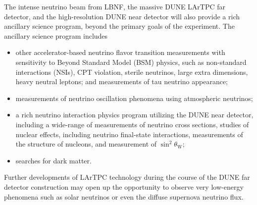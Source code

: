 The intense neutrino beam from LBNF, the massive DUNE LArTPC far detector, and the high-resolution
DUNE near detector will also provide a rich ancillary science program, beyond the primary goals of the experiment. The ancillary science program includes
\begin{itemize}
     \item other accelerator-based neutrino flavor transition measurements with sensitivity to Beyond Standard Model (BSM) physics, such as non-standard interactions (NSIs), CPT violation, sterile neutrinos, large extra dimensions, heavy neutral leptons;
 and measurements of tau neutrino appearance;
     \item measurements of neutrino oscillation phenomena using atmospheric neutrinos;
     \item a rich neutrino interaction physics program utilizing the DUNE near detector, including a wide-range of measurements of neutrino cross sections, studies of nuclear effects, including neutrino final-state interactions, measurements of the structure of nucleons, and  measurement of $\sin^2\theta_\text{W}$;
     \item  searches for dark matter.
\end{itemize} 
Further developments of LArTPC %
technology during the course of the DUNE far detector construction may open up the opportunity
to observe very low-energy phenomena such as solar neutrinos or even the diffuse supernova neutrino flux.



